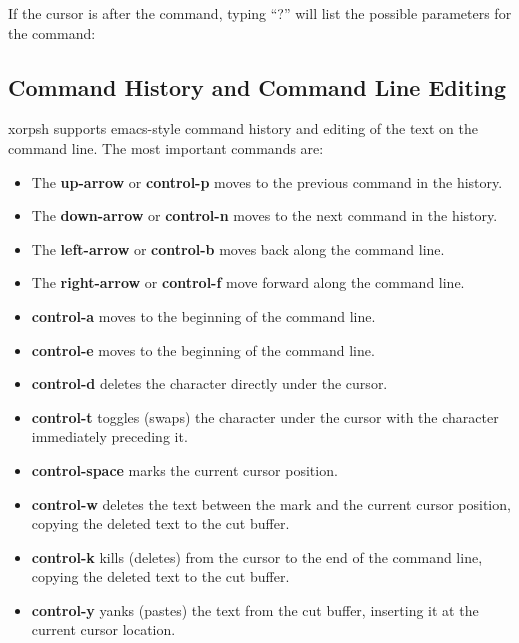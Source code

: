 \documentclass[11pt]{article}
\newcommand{\xorpsh}{{\sf\small xorpsh}\xspace}
\begin{document}
\noindent
If the cursor is after the command, typing ``?'' will list the possible
parameters for the command:
\vspace{0.1in}

\noindent{}

\subsection{Command History and Command Line Editing}

\xorpsh supports emacs-style command history and editing of the text
on the command line.  The most important commands are:
\begin{itemize}
\item The {\bf up-arrow} or {\bf control-p} moves to the previous
command in the history.
\item The {\bf down-arrow} or {\bf control-n} moves to the next
command in the history.
\item The {\bf left-arrow} or {\bf control-b} moves back along the
command line.
\item The {\bf right-arrow} or {\bf control-f} move forward along the
command line.
\item {\bf control-a} moves to the beginning of the command line.
\item {\bf control-e} moves to the beginning of the command line.
\item {\bf control-d} deletes the character directly under the cursor.
\item {\bf control-t} toggles (swaps) the character under the cursor with
the character immediately preceding it.
\item {\bf control-space} marks the current cursor position.
\item {\bf control-w} deletes the text between the mark and the current
cursor position, copying the deleted text to the cut buffer.
\item {\bf control-k} kills (deletes) from the cursor to the end of the
command line, copying the deleted text to the cut buffer.
\item {\bf control-y} yanks (pastes) the text from the cut buffer,
inserting it at the
current cursor location.
\end{itemize}
\end{document}
